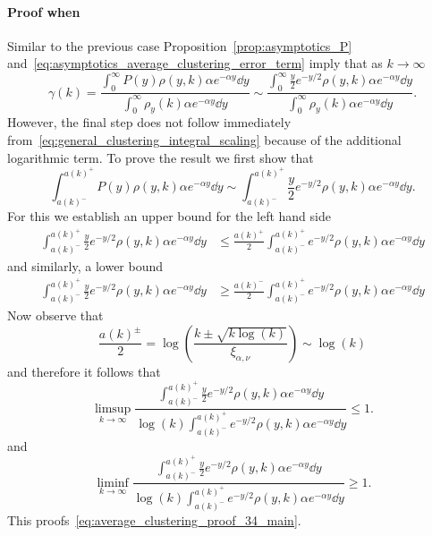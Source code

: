 \paragraph{Proof when }
Similar to the previous case Proposition~\ref{prop:asymptotics_P} and~\eqref{eq:asymptotics_average_clustering_error_term} imply that as $k \to \infty$
\[
	\gamma(k) = \frac{\int_0^{\infty} P(y) \rho(y,k) \alpha  e^{-\alpha y} \dd y}
	{\int_0^\infty \rho_{y}(k) \alpha e^{-\alpha y} \dd y}
	\sim  \frac{\int_0^{\infty} \frac{y}{2} e^{-y/2} \rho(y,k) \alpha  e^{-\alpha y} \dd y}
		{\int_0^\infty \rho_{y}(k) \alpha e^{-\alpha y} \dd y}.
\]
However, the final step does not follow immediately from~\eqref{eq:general_clustering_integral_scaling} because of the additional logarithmic term. To prove the result we first show that
\begin{equation}\label{eq:average_clustering_proof_34_main}
	\int_{a(k)^-}^{a(k)^+} P(y) \rho(y,k) \alpha e^{-\alpha y} \dd y
	\sim \int_{a(k)^-}^{a(k)^+} \frac{y}{2} e^{-y/2} \rho(y,k) \alpha e^{-\alpha y} \dd y.
\end{equation}
For this we establish an upper bound for the left hand side
\begin{align*}
	\int_{a(k)^-}^{a(k)^+} \frac{y}{2} e^{-y/2} \rho(y,k) \alpha e^{-\alpha y} \dd y
	&\le \frac{a(k)^+}{2} \int_{a(k)^-}^{a(k)^+} e^{-y/2} \rho(y,k) \alpha e^{-\alpha y} \dd y
\end{align*}
and similarly, a lower bound
\begin{align*}
	\int_{a(k)^-}^{a(k)^+} \frac{y}{2} e^{-y/2} \rho(y,k) \alpha e^{-\alpha y} \dd y
	&\ge \frac{a(k)^-}{2} \int_{a(k)^-}^{a(k)^+} e^{-y/2} \rho(y,k) \alpha e^{-\alpha y} \dd y
\end{align*}
Now observe that
\[
	\frac{a(k)^\pm}{2} = \log\left(\frac{k \pm \sqrt{k\log(k)}}{\xi_{\alpha, \nu}}\right) \sim \log(k)
\]
and therefore it follows that
\[
	\limsup_{k \to \infty} \frac{\int_{a(k)^-}^{a(k)^+} \frac{y}{2} e^{-y/2} \rho(y,k) \alpha e^{-\alpha y} \dd y}
	{\log(k) \int_{a(k)^-}^{a(k)^+} e^{-y/2} \rho(y,k) \alpha e^{-\alpha y} \dd y} \le 1.
\]
and
\[
	\liminf_{k \to \infty} \frac{\int_{a(k)^-}^{a(k)^+} \frac{y}{2} e^{-y/2} \rho(y,k) \alpha e^{-\alpha y} \dd y}
	{\log(k) \int_{a(k)^-}^{a(k)^+} e^{-y/2} \rho(y,k) \alpha e^{-\alpha y} \dd y} \ge 1.
\]
This proofs~\eqref{eq:average_clustering_proof_34_main}.

